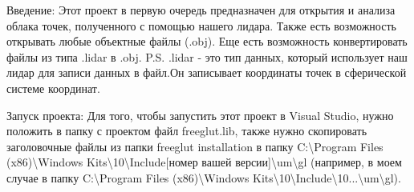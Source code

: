 Введение\+: Этот проект в первую очередь предназначен для открытия и анализа облака точек, полученного с помощью нашего лидара. Также есть возможность открывать любые объектные файлы (.obj). Еще есть возможность конвертировать файлы из типа .lidar в .obj. P.\+S. .lidar -\/ это тип данных, который использует наш лидар для записи данных в файл.\+Он записывает координаты точек в сферической системе координат.

Запуск проекта\+: Для того, чтобы запустить этот проект в Visual Studio, нужно положить в папку с проектом файл freeglut.\+lib, также нужно скопировать заголовочные файлы из папки freeglut installation в папку C\+:\textbackslash{}\+Program Files (x86)\textbackslash{}\+Windows Kits\textbackslash{}10\textbackslash{}\+Include\mbox{[}номер вашей версии\mbox{]}\textbackslash{}um\textbackslash{}gl (например, в моем случае в папку C\+:\textbackslash{}\+Program Files (x86)\textbackslash{}\+Windows Kits\textbackslash{}10\textbackslash{}\+Include\textbackslash{}10...\textbackslash{}um\textbackslash{}gl). 